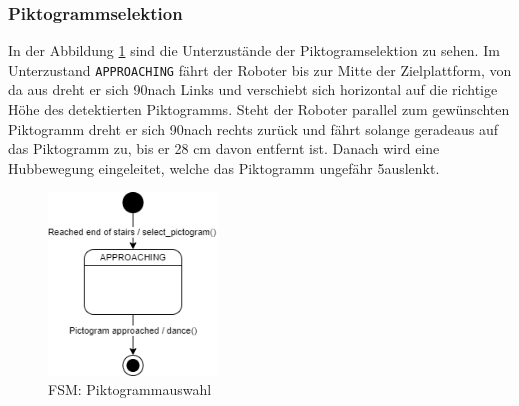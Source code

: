\newpage

\subsubsection{Piktogrammselektion}
In der Abbildung \ref{fig:fsm-pictogram-selection} sind die Unterzustände der Piktogramselektion zu sehen. Im Unterzustand \texttt{APPROACHING} fährt der Roboter bis zur Mitte der Zielplattform, von da aus dreht er sich 90\textdegree nach Links und verschiebt sich horizontal auf die richtige Höhe des detektierten Piktogramms. Steht der Roboter parallel zum gewünschten Piktogramm dreht er sich 90\textdegree nach rechts zurück und fährt solange geradeaus auf das Piktogramm zu, bis er 28 cm davon entfernt ist. Danach wird eine Hubbewegung eingeleitet, welche das Piktogramm ungefähr 5\textdegree auslenkt.
\begin{figure}[H]
  \includegraphics[width=0.40\textwidth]{img/softwarearchitektur/FSM-PICTOGRAM_SELECTION.png}
  \centering
  \caption{FSM: Piktogrammauswahl}
  \label{fig:fsm-pictogram-selection}
\end{figure}

